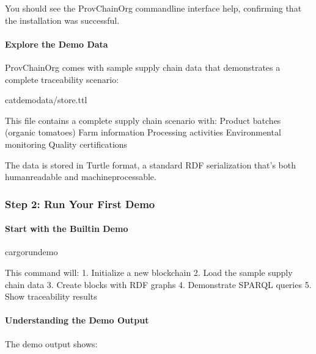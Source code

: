 \documentclass[letterpaper,10pt,english]{sphinxmanual}
\begin{document}
\sphinxAtStartPar
You should see the ProvChainOrg command\sphinxhyphen{}line interface help, confirming that the installation was successful.


\paragraph{Explore the Demo Data}
\label{\detokenize{user-guide/first-steps:explore-the-demo-data}}
\sphinxAtStartPar
ProvChainOrg comes with sample supply chain data that demonstrates a complete traceability scenario:

\begin{sphinxVerbatim}[commandchars=\\\{\}]
catdemo\PYGZus{}data/store.ttl
\end{sphinxVerbatim}

\sphinxAtStartPar
This file contains a complete supply chain scenario with:
\sphinxhyphen{} Product batches (organic tomatoes)
\sphinxhyphen{} Farm information
\sphinxhyphen{} Processing activities
\sphinxhyphen{} Environmental monitoring
\sphinxhyphen{} Quality certifications

\sphinxAtStartPar
The data is stored in Turtle format, a standard RDF serialization that’s both human\sphinxhyphen{}readable and machine\sphinxhyphen{}processable.


\subsubsection{Step 2: Run Your First Demo}
\label{\detokenize{user-guide/first-steps:step-2-run-your-first-demo}}

\paragraph{Start with the Built\sphinxhyphen{}in Demo}
\label{\detokenize{user-guide/first-steps:start-with-the-built-in-demo}}
\begin{sphinxVerbatim}[commandchars=\\\{\}]
cargorundemo
\end{sphinxVerbatim}

\sphinxAtStartPar
This command will:
1. Initialize a new blockchain
2. Load the sample supply chain data
3. Create blocks with RDF graphs
4. Demonstrate SPARQL queries
5. Show traceability results


\paragraph{Understanding the Demo Output}
\label{\detokenize{user-guide/first-steps:understanding-the-demo-output}}
\sphinxAtStartPar
The demo output shows:
\end{document}
